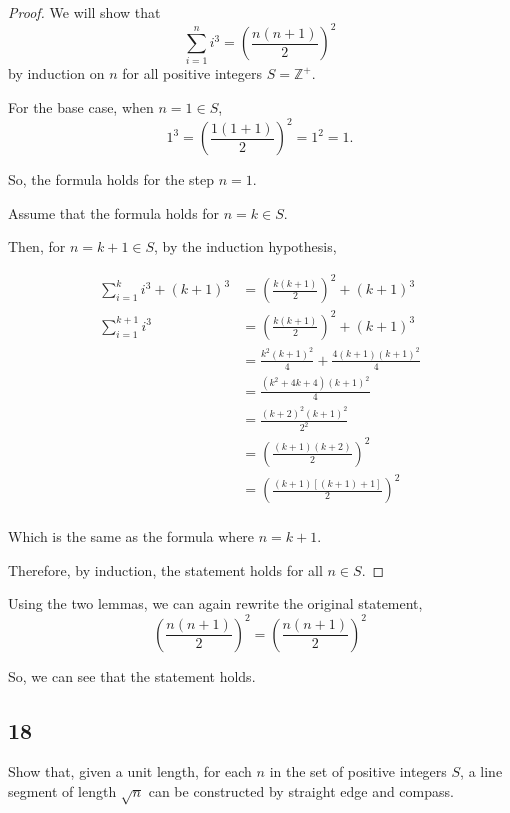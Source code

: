 \documentclass{article}
\begin{document}
\begin{proof}        
    We will show that \[\sum\limits_{i=1}^{n} i^3 = {\left( \frac{n(n+1)}{2} \right)}^2\] 
    by induction on $n$ for all positive integers $S = \mathbb{Z}^{+}$.

    For the base case, when $n=1 \in S$, \[1^3 = {\left( \frac{1(1+1)}{2} \right)}^2 = 1^2 = 1.\]

    So, the formula holds for the step $n=1$.

    Assume that the formula holds for $n=k \in S$.

    Then, for $n=k+1 \in S$, by the induction hypothesis,

    \begin{align*}
        \sum\limits_{i=1}^{k} i^3 + {(k+1)}^3 &= {\left( \frac{k(k+1)}{2} \right)}^2 + {(k+1)}^3 \\
        \sum\limits_{i=1}^{k+1} i^3 &= {\left( \frac{k(k+1)}{2} \right)}^2 + {(k+1)}^3 \\
        &= \frac{k^2 {(k+1)}^2}{4} + \frac{4(k+1){(k+1)}^2}{4} \\
        &= \frac{(k^2+4k+4){(k+1)}^2}{4} \\
        &= \frac{{(k+2)}^2 {(k+1)}^2}{2^2} \\
        &= {\left( \frac{(k+1)(k+2)}{2} \right)}^2 \\
        &= {\left( \frac{(k+1)[(k+1)+1]}{2} \right)}^2 \\
    \end{align*}

    Which is the same as the formula where $n=k+1$.

    Therefore, by induction, the statement holds for all $n \in S$.\qedhere

\end{proof}

Using the two lemmas, we can again rewrite the original statement, 
\[{\left( \frac{n(n+1)}{2} \right)}^2 = {\left( \frac{n(n+1)}{2} \right)}^2\]

So, we can see that the statement holds.


\subsection*{18}

Show that, given a unit length, for each $n$ in the set of positive integers $S$, 
a line segment of length $\sqrt{n}$ can be constructed by straight edge and compass.
\end{document}
